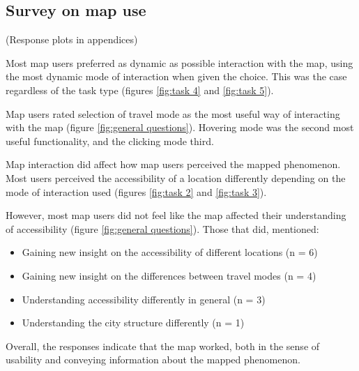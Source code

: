 

\subsection{Survey on map use}

(Response plots in appendices)

Most map users preferred as dynamic as possible interaction with the map,
using the most dynamic mode of interaction when given the choice.
This was the case regardless of the task type (figures \ref{fig:task 4} and \ref{fig:task 5}).

Map users rated selection of travel mode as the most useful way of
interacting with the map (figure \ref{fig:general questions}).
Hovering mode was the second most useful functionality,
and the clicking mode third.

Map interaction did affect how map users perceived the mapped phenomenon.
Most users perceived the accessibility of a location differently depending
on the mode of interaction used (figures \ref{fig:task 2} and \ref{fig:task 3}).

However, most map users did not feel like the map affected
their understanding of accessibility (figure \ref{fig:general questions}).
Those that did, mentioned:

\begin{itemize}
	\item Gaining new insight on the accessibility of different locations (n = 6)
	\item Gaining new insight on the differences between travel modes (n = 4)
	\item Understanding accessibility differently in general (n = 3)
	\item Understanding the city structure differently (n = 1)
\end{itemize}

Overall, the responses indicate that the map worked,
both in the sense of usability and conveying information about the mapped phenomenon.

